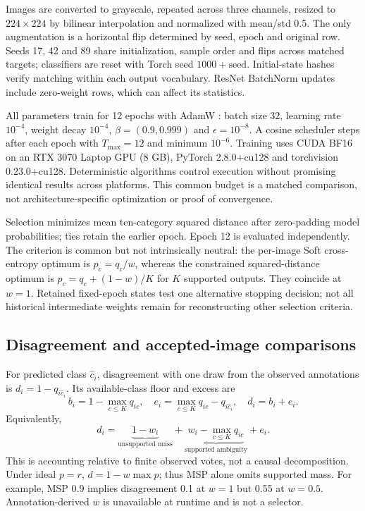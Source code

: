 Images are converted to grayscale, repeated across three channels, resized to $224\times224$ by bilinear interpolation and normalized with mean/std 0.5. The only augmentation is a horizontal flip determined by seed, epoch and original row. Seeds 17, 42 and 89 share initialization, sample order and flips across matched targets; classifiers are reset with Torch seed $1000+\mathrm{seed}$. Initial-state hashes verify matching within each output vocabulary. ResNet BatchNorm updates include zero-weight rows, which can affect its statistics.

All parameters train for 12 epochs with AdamW \cite{loshchilov2019adamw}: batch size 32, learning rate $10^{-4}$, weight decay $10^{-4}$, $\beta=(0.9,0.999)$ and $\epsilon=10^{-8}$. A cosine scheduler steps after each epoch with $T_{\max}=12$ and minimum $10^{-6}$. Training uses CUDA BF16 on an RTX 3070 Laptop GPU (8 GB), PyTorch 2.8.0+cu128 and torchvision 0.23.0+cu128. Deterministic algorithms control execution without promising identical results across platforms. This common budget is a matched comparison, not architecture-specific optimization or proof of convergence.

Selection minimizes mean ten-category squared distance after zero-padding model probabilities; ties retain the earlier epoch. Epoch 12 is evaluated independently. The criterion is common but not intrinsically neutral: the per-image Soft cross-entropy optimum is $p_c=q_c/w$, whereas the constrained squared-distance optimum is $p_c=q_c+(1-w)/K$ for $K$ supported outputs. They coincide at $w=1$. Retained fixed-epoch states test one alternative stopping decision; not all historical intermediate weights remain for reconstructing other selection criteria.



\subsection{Disagreement and accepted-image comparisons}
For predicted class $\hat c_i$, disagreement with one draw from the observed annotations is $d_i=1-q_{i\hat c_i}$. Its available-class floor and excess are
\begin{equation}
b_i=1-\max_{c\leq K}q_{ic},\quad e_i=\max_{c\leq K}q_{ic}-q_{i\hat c_i},\quad d_i=b_i+e_i.
\label{eq:decomposition}
\end{equation}
Equivalently,
\begin{equation}
d_i=\underbrace{1-w_i}_{\text{unsupported mass}}+
\underbrace{w_i-\max_{c\leq K}q_{ic}}_{\text{supported ambiguity}}+e_i.
\label{eq:threeparts}
\end{equation}
This is accounting relative to finite observed votes, not a causal decomposition. Under ideal $p=r$, $d=1-w\max p$; thus MSP alone omits supported mass. For example, MSP 0.9 implies disagreement 0.1 at $w=1$ but 0.55 at $w=0.5$. Annotation-derived $w$ is unavailable at runtime and is not a selector.

